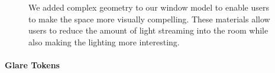 \documentclass[10pt,twocolumn,letterpaper]{article}
\begin{document}
\begin{figure}[t]
\caption{ We added complex geometry to our window model to enable
  users to make the space more visually compelling.  These materials allow users to
  reduce the amount of light streaming into the room while also making
  the lighting more interesting.}%
\vspace{-0.15in}
\label{FIGURE:screens}
\end{figure}


\vspace{-0.1in}
\paragraph{Glare Tokens}

\end{document}
